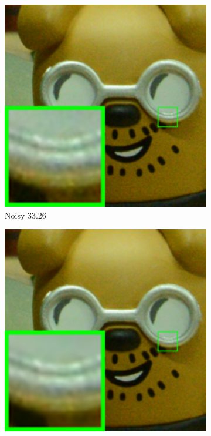 \begin{figure}
\begin{subfigure}[t]{0.19\textwidth}
        \includegraphics[width=1\textwidth]{images/twsc/cc/resize_br_Noisy_d800_iso3200_1_real.png}
		\caption{Noisy 33.26}
    \end{subfigure}
    \hfill
    \begin{subfigure}[t]{0.19\textwidth}
        \centering
        \includegraphics[width=1\textwidth]{images/twsc/cc/resize_br_CBM3D_d800_iso3200_1_real.png}

\end{subfigure}
\end{figure}
